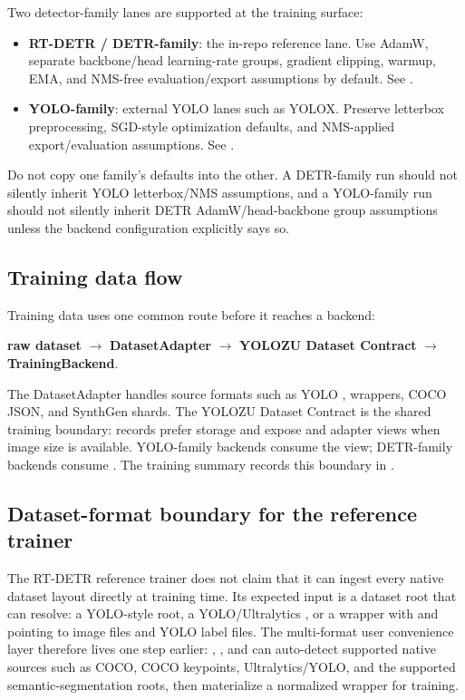 Two detector-family lanes are supported at the training surface:
\begin{itemize}
  \item \textbf{RT-DETR / DETR-family}: the in-repo reference lane. Use AdamW,
  separate backbone/head learning-rate groups, gradient clipping, warmup, EMA,
  and NMS-free evaluation/export assumptions by default. See
  .
  \item \textbf{YOLO-family}: external YOLO lanes such as YOLOX. Preserve
  letterbox preprocessing, SGD-style optimization defaults, and NMS-applied
  export/evaluation assumptions. See
  .
\end{itemize}

Do not copy one family's defaults into the other. A DETR-family run should not
silently inherit YOLO letterbox/NMS assumptions, and a YOLO-family run should not
silently inherit DETR AdamW/head-backbone group assumptions unless the backend
configuration explicitly says so.

\subsection{Training data flow}
Training data uses one common route before it reaches a backend:
\begin{center}
\textbf{raw dataset}
\(\rightarrow\)
\textbf{DatasetAdapter}
\(\rightarrow\)
\textbf{YOLOZU Dataset Contract}
\(\rightarrow\)
\textbf{TrainingBackend}.
\end{center}

The DatasetAdapter handles source formats such as YOLO ,
 wrappers, COCO JSON, and SynthGen shards. The YOLOZU Dataset
Contract is the shared training boundary: records prefer  storage
and expose  and  adapter views when image size is
available. YOLO-family backends consume the  view; DETR-family
backends consume . The training summary records this boundary in
.

\subsection{Dataset-format boundary for the reference trainer}
The RT-DETR reference trainer does not claim that it can ingest every native dataset layout directly at training time. Its expected input is a dataset root that  can resolve: a YOLO-style root, a YOLO/Ultralytics , or a  wrapper with  and  pointing to image files and YOLO label files. The multi-format user convenience layer therefore lives one step earlier: , , and  can auto-detect supported native sources such as COCO, COCO keypoints, Ultralytics/YOLO, and the supported semantic-segmentation roots, then materialize a normalized wrapper for training.

